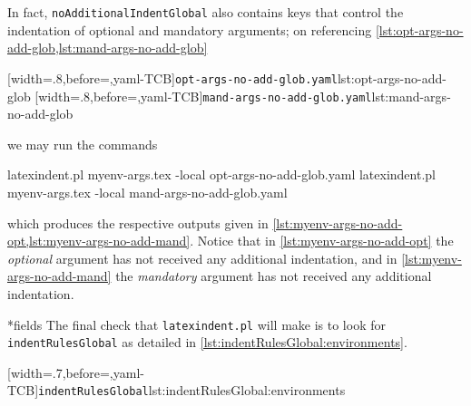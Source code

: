 \documentclass[10pt]{article}
\begin{document}
 \begin{example}
 In fact, \texttt{noAdditionalIndentGlobal} also contains keys that control the
 indentation of optional and mandatory arguments; on referencing
 \cref{lst:opt-args-no-add-glob,lst:mand-args-no-add-glob}

 \begin{cmhtcbraster}
  [width=.8\linewidth,before=\centering,yaml-TCB]{\texttt{opt-args-no-add-glob.yaml}}{lst:opt-args-no-add-glob}
  [width=.8\linewidth,before=\centering,yaml-TCB]{\texttt{mand-args-no-add-glob.yaml}}{lst:mand-args-no-add-glob}
 \end{cmhtcbraster}

 we may run the commands 

 \begin{commandshell}
latexindent.pl myenv-args.tex -local opt-args-no-add-glob.yaml
latexindent.pl myenv-args.tex -local mand-args-no-add-glob.yaml
\end{commandshell}

 which produces the respective outputs given in
 \cref{lst:myenv-args-no-add-opt,lst:myenv-args-no-add-mand}. Notice that in
 \cref{lst:myenv-args-no-add-opt} the \emph{optional} argument has not received any
 additional indentation, and in \cref{lst:myenv-args-no-add-mand} the \emph{mandatory}
 argument has not received any additional indentation.

 \begin{cmhtcbraster}
 \end{cmhtcbraster}
 \end{example}

*{fields}
 The final check that \texttt{latexindent.pl} will make is to look for
 \texttt{indentRulesGlobal} as detailed in \cref{lst:indentRulesGlobal:environments}.

 [width=.7\linewidth,before=\centering,yaml-TCB]{\texttt{indentRulesGlobal}}{lst:indentRulesGlobal:environments}
\end{document}

